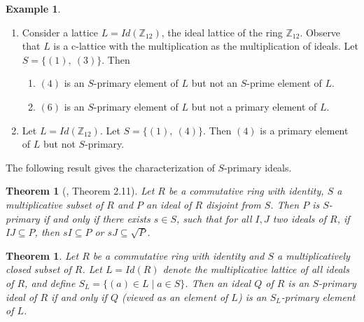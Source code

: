 \documentclass[10pt,twoside,a4]{amsart}
\numberwithin{equation}{section}
\theoremstyle{plain}
\newtheorem{thm}[lem]{Theorem}
\theoremstyle{definition}
\newtheorem{exa}[lem]{Example}
\begin{document}
\begin{exa}	
	\begin{enumerate}
		\item Consider a lattice $L=Id(\mathbb{Z}_{12})$, the ideal lattice of the ring $\mathbb{Z}_{12} $.  Observe that  $L$ is a c-lattice with the multiplication as the multiplication  of ideals. Let $S = \{(1), ~(3) \}$. Then
		\begin{enumerate}
			\item  $(4)$ is an $S$-primary element of $L$ but not an $S$-prime element of $L$.
			
			\item $(6)$ is an $S$-primary element of $L$ but not a primary element of $L$.
		\end{enumerate}
		
		\item Let $L=Id(\mathbb{Z}_{12})$. Let $S = \{(1), ~(4) \}$. Then $(4)$ is a primary element of $L$ but not $S$-primary.
		
	\end{enumerate}	
\end{exa}

The following result gives the characterization of $S$-primary ideals.
\begin{thm}[\cite{M}, Theorem 2.11]\label{2.11.}
	Let $R$ be a commutative ring with identity, $S$ a multiplicative subset of $R$ and $P$ an ideal of $R$ disjoint from $S$. Then $P$ is $S$-primary if and only if there exists $s \in S$, such that for all $I, J$ two ideals of $R$, if $IJ \subseteq P$, then $sI \subseteq P$ or $sJ \subseteq \sqrt{P}$.
\end{thm}



\begin{thm}\label{thm:S-primary-lattice-converse}
	Let $R$ be a commutative ring with identity and $S$ a multiplicatively closed subset of $R$. 
	Let $L=Id(R)$ denote the multiplicative lattice of all ideals of $R$, and define
	$S_L=\{(a)\in L \mid a\in S\}$.
	Then an ideal $Q$ of $R$ is an $S$-primary ideal of $R$ if and only if $Q$ (viewed as an element of $L$)
	is an $S_L$-primary element of $L$.
\end{thm}
\end{document}
